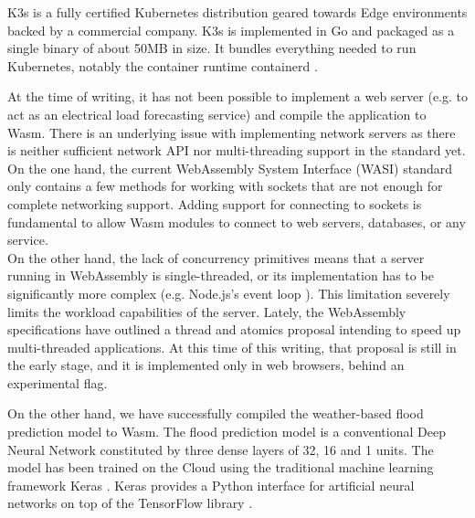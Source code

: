 K3s is a fully certified Kubernetes distribution geared towards Edge environments backed by a commercial company. K3s is implemented in Go and packaged as a single binary of about 50MB in size. It bundles everything needed to run Kubernetes, notably the container runtime containerd \cite{containerd}.

At the time of writing, it has not been possible to implement a web server (e.g. to act as an electrical load forecasting service) and compile the application to Wasm. There is an underlying issue with implementing network servers as there is neither sufficient network API nor multi-threading support in the standard yet.
On the one hand, the current WebAssembly System Interface (WASI) standard only contains a few methods for working with sockets that are not enough for complete networking support. Adding support for connecting to sockets is fundamental to allow Wasm modules to connect to web servers, databases, or any service. \\
On the other hand, the lack of concurrency primitives means that a server running in WebAssembly is single-threaded, or its implementation has to be significantly more complex (e.g. Node.js's event loop \cite{nodejs-event-loop}). This limitation severely limits the workload capabilities of the server. 
Lately, the WebAssembly specifications have outlined a thread and atomics proposal intending to speed up multi-threaded applications. At this time of this writing, that proposal is still in the early stage, and it is implemented only in web browsers, behind an experimental flag.



On the other hand, we have successfully compiled the weather-based flood prediction model to Wasm. The flood prediction model is a conventional Deep Neural Network constituted by three dense layers of 32, 16 and 1 units. The model has been trained on the Cloud using the traditional machine learning framework Keras \cite{keras}. Keras provides a Python interface for artificial neural networks on top of the TensorFlow library \cite{tensorflow}.


